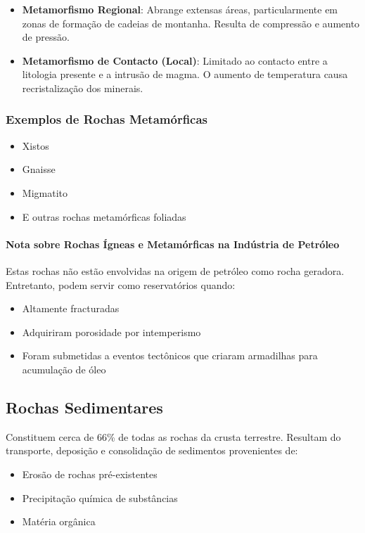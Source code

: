 \documentclass[12pt,a4paper,twoside]{book}
\begin{document}
\begin{itemize}
    \item \textbf{Metamorfismo Regional}: Abrange extensas áreas, particularmente em zonas de formação 
    de cadeias de montanha. Resulta de compressão e aumento de pressão.
    
    \item \textbf{Metamorfismo de Contacto (Local)}: Limitado ao contacto entre a litologia presente 
    e a intrusão de magma. O aumento de temperatura causa recristalização dos minerais.
\end{itemize}

\subsubsection{Exemplos de Rochas Metamórficas}

\begin{itemize}
    \item Xistos
    \item Gnaisse
    \item Migmatito
    \item E outras rochas metamórficas foliadas
\end{itemize}

\paragraph{Nota sobre Rochas Ígneas e Metamórficas na Indústria de Petróleo}

Estas rochas não estão envolvidas na origem de petróleo como rocha geradora. Entretanto, podem servir 
como reservatórios quando:
\begin{itemize}
    \item Altamente fracturadas
    \item Adquiriram porosidade por intemperismo
    \item Foram submetidas a eventos tectônicos que criaram armadilhas para acumulação de óleo
\end{itemize}

\subsection{Rochas Sedimentares}

Constituem cerca de 66\% de todas as rochas da crusta terrestre. Resultam do transporte, deposição 
e consolidação de sedimentos provenientes de:
\begin{itemize}
    \item Erosão de rochas pré-existentes
    \item Precipitação química de substâncias
    \item Matéria orgânica
\end{itemize}
\end{document}
